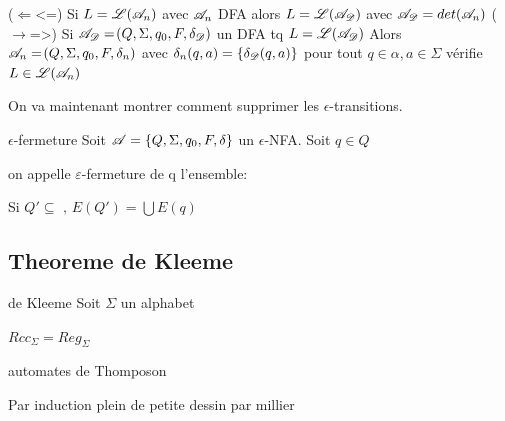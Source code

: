 \documentclass[a4paper,french,bookmarks]{book}
\begin{document}
    \begin{nproof}
        ($\Leftarrow$<=) Si $L = \mathscr{L} \!\left(\mathscr{A}_n\right)$ avec $\mathscr{A}_n$ DFA alors $L = \mathscr{L} \!\left(\mathscr{A}_{\mathscr{D}}\right)$ avec $\mathscr{A}_{\mathscr{D}} = det \!\left(\mathscr{A}_n\right)$
        ($\rightarrow$=>) Si $\mathscr{A}_{\mathscr{D}} = \!\left(Q, \Sigma, q_0, F, \delta_{\mathscr{D}}\right)$ un DFA tq $L = \mathscr{L} \!\left(\mathscr{A}_{\mathscr{D}}\right)$
        Alors$\mathscr{A}_n = \!\left(Q, \Sigma, q_0, F, \delta_n\right)$ avec $\delta_n \!\left(q, a\right) = \left\{\delta_{\mathscr{D}} \!\left(q, a\right)\right\}$ pour tout $q \in \alpha, a \in \Sigma$ vérifie $L \in \mathscr{L} \!\left(\mathscr{A}_n\right)$
    \end{nproof}
    
    On va maintenant montrer comment supprimer les $\epsilon$-transitions.
    
    \begin{definition}{$\epsilon$-fermeture}{}
        Soit $\mathscr{A} = \left\{Q, \Sigma, q_0, F, \delta\right\}$ un $\epsilon$-NFA. 
        Soit $q\in Q $ %
        
        on appelle $\varepsilon$-fermeture de q l'ensemble: 
        
        
    \end{definition}
    \begin{notation}
        Si $Q' \subseteq \text{  , } E(Q') = \bigcup E(q) $ 
        
    \end{notation}
    
    
    \subsection{Theoreme de Kleeme}
    
    \begin{theorem}{de Kleeme}{}
    Soit $\Sigma$ un alphabet 
    
    
    $Rcc_\Sigma = Reg_\Sigma$
    
    
    \end{theorem}
    \begin{definition}{automates de Thomposon}{}
        
    \end{definition}
    
    \begin{nproof}{Par induction}
        plein de petite dessin par millier 
        
    \end{nproof}
    
\end{document}
